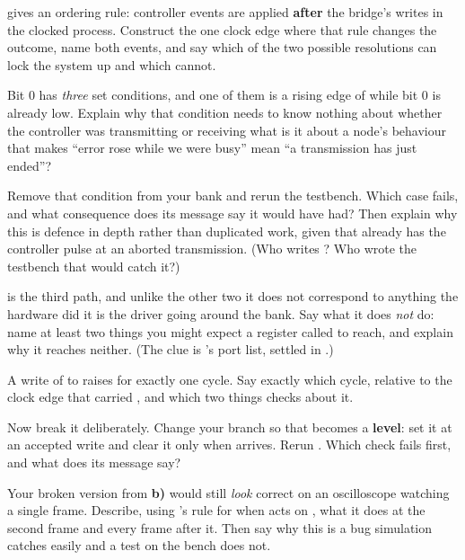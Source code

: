   gives an ordering rule: controller events are applied \textbf{after}
the bridge's writes in the clocked process. Construct the one clock edge where that rule changes the
outcome, name both events, and say which of the two possible resolutions can lock the system up and
which cannot.

 Bit 0 has \emph{three} set conditions, and one of them is a rising edge of 
while bit 0 is already low. Explain why that condition needs to know nothing about whether the
controller was transmitting or receiving \textemdash{} what is it about a node's behaviour that makes
``error rose while we were busy'' mean ``a transmission has just ended''?

 Remove that condition from your bank and rerun the testbench. Which case fails, and what
consequence does its message say it would have had? Then explain why this is defence in depth rather
than duplicated work, given that  already has the controller pulse  at
an aborted transmission. (Who writes ? Who wrote the testbench that would catch
it?)

  is the third path, and unlike the other two it does not correspond to
anything the hardware did \textemdash{} it is the driver going around the bank. Say what it does
\emph{not} do: name at least two things you might expect a register called  to reach,
and explain why it reaches neither. (The clue is 's port list, settled in
.)

\label{c18:ex:txsend}
 A write of  to  raises  for exactly one cycle. Say
exactly which cycle, relative to the clock edge that carried , and which two things
 checks about it.

 Now break it deliberately. Change your  branch so that  becomes a
\textbf{level}: set it at an accepted write and clear it only when  arrives. Rerun
. Which check fails first, and what does its message say?

 Your broken version from \textbf{b)} would still \emph{look} correct on an oscilloscope
watching a single frame. Describe, using 's rule for when
 acts on , what it does at the second frame and every frame after
it. Then say why this is a bug simulation catches easily and a test on the bench does not.

